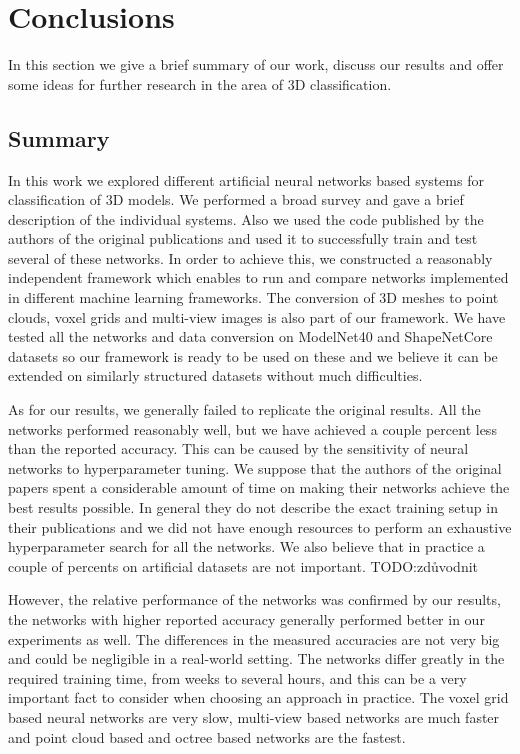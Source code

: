 \chapter{Conclusions}
\label{sec:chap6}
In this section we give a brief summary of our work, discuss our results and offer some ideas for further research in the area of 3D classification.
\section{Summary}
In this work we explored different artificial neural networks based systems for classification of 3D models. We performed a broad survey and gave a brief description of the individual systems. Also we used the code published by the authors of the original publications and used it to successfully train and test several of these networks. In order to achieve this, we constructed a reasonably independent framework which enables to run and compare networks implemented in different machine learning frameworks. The conversion of 3D meshes to point clouds, voxel grids and multi-view images is also part of our framework. We have tested all the networks and data conversion on ModelNet40 and ShapeNetCore datasets so our framework is ready to be used on these and we believe it can be extended on similarly structured datasets without much difficulties. \par
As for our results, we generally failed to replicate the original results. All the networks performed reasonably well, but we have achieved a couple percent less than the reported accuracy. This can be caused by the sensitivity of neural networks to hyperparameter tuning. We suppose that the authors of the original papers spent a considerable amount of time on  making their networks achieve the best results possible. In general they do not describe the exact training setup in their publications and we did not have enough resources to perform an exhaustive hyperparameter search for all the networks. We also believe that in practice a couple of percents on artificial datasets are not important. TODO:zdůvodnit\par
However, the relative performance of the networks was confirmed by our results, the networks with higher reported accuracy generally performed better in our experiments as well. The differences in the measured accuracies are not very big and could be negligible in a real-world setting. The networks differ greatly in the required training time, from weeks to several hours, and this can be a very important fact to consider when choosing an approach in practice. The voxel grid based neural networks are very slow, multi-view based networks are much faster and point cloud based and octree based networks are the fastest. 

